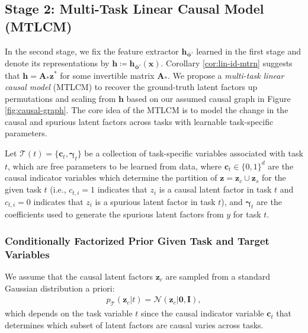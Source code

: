 \documentclass{article} %
\theoremstyle{plain}
\theoremstyle{definition}
\theoremstyle{remark}
\begin{document}
\subsection{Stage 2: Multi-Task Linear Causal Model (MTLCM)} 
\vspace{-0.75ex}
In the second stage, we fix the feature extractor $\mathbf{h}_{\boldsymbol{\phi}'}$ learned in the first stage and denote its representations by $\mathbf{h}\coloneqq\mathbf{h}_{\boldsymbol{\phi}'}(\mathbf{x})$. Corollary \ref{cor:lin-id-mtrn} suggests that $\mathbf{h}=\mathbf{A}_{*}\mathbf{z}^*$ for some invertible matrix $\mathbf{A}_{*}$. 
We propose a \textit{multi-task linear causal model} (MTLCM) to recover the ground-truth latent factors up permutations and scaling from $\mathbf{h}$ based on our assumed causal graph in Figure \ref{fig:causal-graph}. The core idea of the MTLCM is to model the change in the causal and spurious latent factors across tasks with learnable task-specific parameters.

Let $\mathcal{T}(t)=\{\mathbf{c}_t,\boldsymbol{\gamma}_t\}$ be a collection of task-specific variables associated with task $t$, which are free parameters to be learned from data, where $\mathbf{c}_t\in\{0,1\}^d$ are the causal indicator variables which determine the partition of $\mathbf{z}=\mathbf{z}_c\cup\mathbf{z}_s$ for the given task $t$ (i.e., $c_{t,i}=1$ indicates that $z_i$ is a causal latent factor in task $t$ and $c_{t,i}=0$ indicates that $z_i$ is a spurious latent factor in task $t$), and $\boldsymbol{\gamma}_t$ are the coefficients used to generate the spurious latent factors from $y$ for task $t$. 

\vspace{-0.75ex}
\subsubsection{Conditionally Factorized Prior Given Task and Target Variables}
We assume that the causal latent factors $\mathbf{z}_c$ are sampled from a standard Gaussian distribution a priori:
\begin{align}
    p_{\mathcal{T}}(\mathbf{z}_c|t)=\mathcal{N}(\mathbf{z}_c|\mathbf{0},\mathbf{I}),
\end{align}
which depends on the task variable $t$ since the causal indicator variable $\mathbf{c}_t$ that determines which subset of latent factors are causal varies across tasks.
\end{document}
